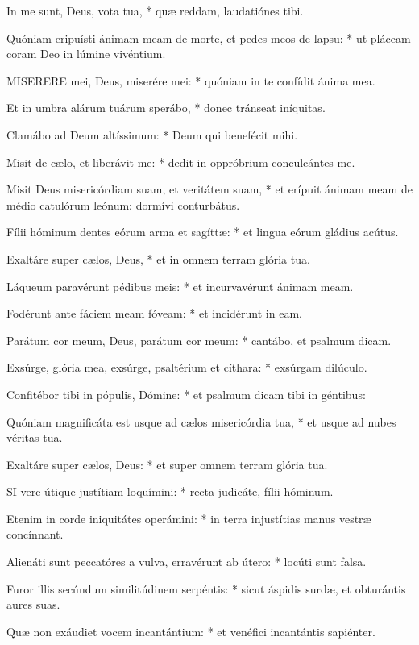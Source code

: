 In me sunt, Deus, vota tua, * quæ reddam, laudatiónes tibi.

Quóniam eripuísti ánimam meam de morte, et pedes meos de lapsu: * ut pláceam coram Deo in lúmine vivéntium.


\lettrine[lines=2]{M}{ISERERE} mei, Deus, miserére mei: * quóniam in te confídit ánima mea.

Et in umbra alárum tuárum sperábo, * donec tránseat iníquitas.

Clamábo ad Deum altíssimum: * Deum qui benefécit mihi.

Misit de cælo, et liberávit me: * dedit in oppróbrium conculcántes me.

Misit Deus misericórdiam suam, et veritátem suam, * et erípuit ánimam meam de médio catulórum leónum: dormívi conturbátus.

Fílii hóminum dentes eórum arma et sagíttæ: * et lingua eórum gládius acútus.

Exaltáre super cælos, Deus, * et in omnem terram glória tua.

Láqueum paravérunt pédibus meis: * et incurvavérunt ánimam meam.

Fodérunt ante fáciem meam fóveam: * et incidérunt in eam.

Parátum cor meum, Deus, parátum cor meum: * cantábo, et psalmum dicam.

Exsúrge, glória mea, exsúrge, psaltérium et cíthara: * exsúrgam dilúculo.

Confitébor tibi in pópulis, Dómine: * et psalmum dicam tibi in géntibus:

Quóniam magnificáta est usque ad cælos misericórdia tua, * et usque ad nubes véritas tua.

Exaltáre super cælos, Deus: * et super omnem terram glória tua.


\lettrine[lines=2]{S}{I} vere útique justítiam loquímini: * recta judicáte, fílii hóminum.

Etenim in corde iniquitátes operámini: * in terra injustítias manus vestræ concínnant.

Alienáti sunt peccatóres a vulva, erravérunt ab útero: * locúti sunt falsa.

Furor illis secúndum similitúdinem serpéntis: * sicut áspidis surdæ, et obturántis aures suas.

Quæ non exáudiet vocem incantántium: * et venéfici incantántis sapiénter.


